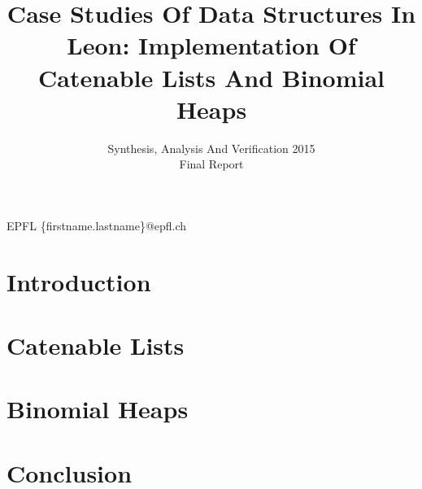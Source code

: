 \documentclass[nocopyrightspace,11pt,authoryear,preprint]{sigplanconf}
\begin{document}


\title{Case Studies Of Data Structures In Leon: Implementation Of Catenable Lists And Binomial Heaps}
\subtitle{Synthesis, Analysis And Verification 2015
\\ Final Report}

           {EPFL}
           {\{firstname.lastname\}@epfl.ch}

\maketitle

\section{Introduction}


\section{Catenable Lists}


\section{Binomial Heaps}


\section{Conclusion}




\end{document}
